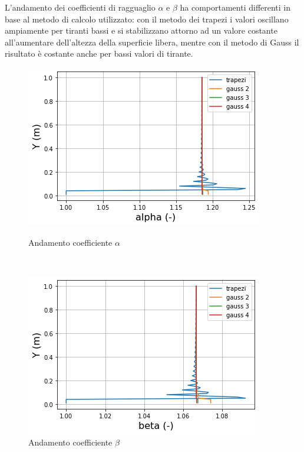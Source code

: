 \documentclass[12pt]{article} %
\begin{document}
\noindent L’andamento dei coefficienti di ragguaglio $\alpha$ e $\beta$ ha comportamenti differenti in base al metodo di calcolo utilizzato: con il metodo dei trapezi i valori oscillano ampiamente per tiranti bassi e si stabilizzano attorno ad un valore costante all’aumentare dell’altezza della superficie libera, mentre con il metodo di Gauss il risultato è costante anche per bassi valori di tirante. 

\begin{figure}[H]
\begin{minipage}[b]{8.5cm}
\centering
    \includegraphics[width=1 \textwidth]{alphatri.png}
    \caption{Andamento coefficiente $\alpha$}
    \label{fig:triangolare_alfa}
\end{minipage}
\ \hspace{2mm} \hspace{3mm} \
\begin{minipage}[b]{8.5cm}
    \centering
    \includegraphics[width=1 \textwidth]{betatri.png}
    \caption{Andamento coefficiente $\beta$}
    \label{fig:triangolare_beta}
\end{minipage}
\end{figure}
\end{document}
